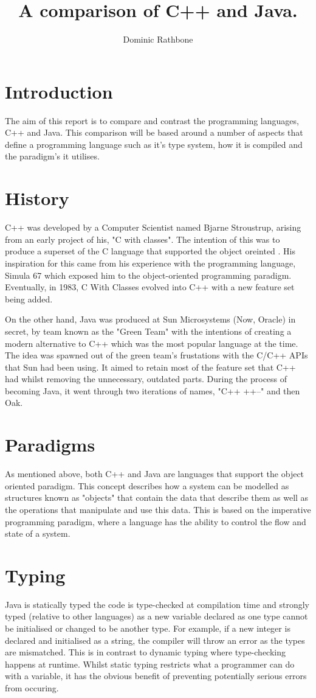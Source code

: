 \documentclass[]{report}
\title{A comparison of C++ and Java.}
\author{Dominic Rathbone}
\begin{document}
\maketitle
\section{Introduction}
The aim of this report is to compare and contrast the programming languages, C++ and Java. This comparison will be based around a number of aspects that define a programming language such as it's type system, how it is compiled and the paradigm's it utilises.

\section{History}
C++ was developed by a Computer Scientist named Bjarne Stroustrup, arising from an early project of his, "C with classes". The intention of this was to produce a superset of the C language that supported the object oreinted . His inspiration for this came from his experience with the programming language, Simula 67 which exposed him to the object-oriented programming paradigm. Eventually, in 1983, C With Classes evolved into C++ with a new feature set being added. \cite{HistoryC++}

On the other hand, Java was produced at Sun Microsystems (Now, Oracle) in secret, by team known as the "Green Team" with the intentions of creating a modern alternative to C++ which was the most popular language at the time. The idea was spawned out of the green team's frustations with the C/C++ APIs that Sun had been using. It aimed to retain most of the feature set that C++ had whilst removing the unnecessary, outdated parts. During the process of becoming Java, it went through two iterations of names, "C++ ++--" and then Oak.\cite{HistoryJava}

\section{Paradigms}
As mentioned above, both C++ and Java are languages that support the object oriented paradigm. This concept describes how a system can be modelled as structures known as "objects" that contain the data that describe them as well as the operations that manipulate and use this data. This is based on the imperative programming paradigm, where a language has the ability to control the flow and state of a system.

\section{Typing}
Java is statically typed the code is type-checked at compilation time and strongly typed (relative to other languages) as a new variable declared as one type cannot be initialised or changed to be another type. For example, if a new integer is declared and initialised as a string, the compiler will throw an error as the types are mismatched. This is in contrast to dynamic typing where type-checking happens at runtime. Whilst static typing restricts what a programmer can do with a variable, it has the obvious benefit of preventing potentially serious errors from occuring. 	
\end{document}
